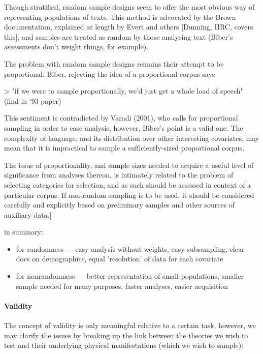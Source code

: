 Though stratified, random sample designs seem to offer the most obvious way of representing populations of texts.  This method is advocated by the Brown documentation, explained at length by Evert and others [Dunning, IIRC, covers this], and samples are treated as random by those analysing text (Biber's assessments don't weight things, for example).

The problem with random sample designs remains their attempt to be proportional.  Biber, rejecting the idea of a proportional corpus says

 > "if we were to sample proportionally, we'd just get a whole load of speech" (find in '93 paper)

This sentiment is contradicted by Varadi (2001), who calls for proportional sampling in order to ease analysis, however, Biber's point is a valid one.  The complexity of language, and its distribution over other interesting covariates, may mean that it is impractical to sample a sufficiently-sized proportional corpus.

The issue of proportionality, and sample sizes needed to acquire a useful level of significance from analyses thereon, is intimately related to the problem of selecting categories for selection, and as such should be assessed in context of a particular corpus.  If non-random sampling is to be used, it should be considered carefully and explicitly based on preliminary samples and other sources of auxiliary data.]

in summary:

\begin{itemize}
 \item for randomness --- easy analysis without weights, easy subsampling, clear docs on demographics, equal 'resolution' of data for each covariate
 \item for nonrandomness --- better representation of small populations, smaller sample needed for many purposes, faster analyses, easier acquisition
\end{itemize}



\paragraph{Validity}
The concept of validity is only meaningful relative to a certain task, however, we may clarify the issues by breaking up the link between the theories we wish to test and their underlying physical manifestations (which we wish to sample):

